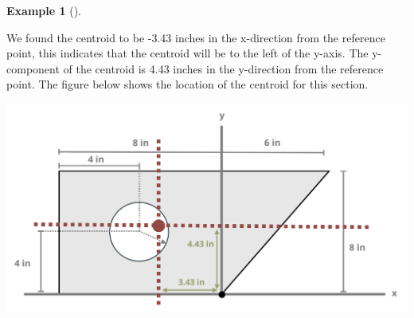 \documentclass[
  letterpaper,
  DIV=11,
  numbers=noendperiod]{scrreprt}
\theoremstyle{definition}
\newtheorem{example}{Example}[chapter]
\theoremstyle{remark}
\begin{document}
\begin{tcolorbox}
\begin{example}[]
\begin{tcolorbox}
We found the centroid to be -3.43 inches in the x-direction from the
reference point, this indicates that the centroid will be to the left of
the y-axis. The y-component of the centroid is 4.43 inches in the
y-direction from the reference point. The figure below shows the
location of the centroid for this section.

\begin{center}
\includegraphics[width=5.28125in,height=\textheight]{images/CH 8 PNGs/example 8.3 part 5.png}
\end{center}

\end{tcolorbox}

\end{example}

\end{tcolorbox}
\end{document}
